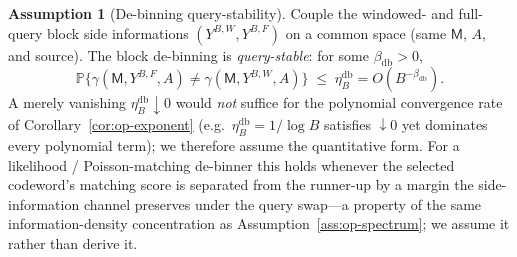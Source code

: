 \documentclass[11pt]{article}
\newcommand{\Prob}{\mathbb{P}}
\theoremstyle{plain}
\theoremstyle{definition}
\newtheorem{assumption}[theorem]{Assumption}
\theoremstyle{remark}
\begin{document}
\begin{assumption}[De-binning query-stability]
\label{ass:op-debin}
Couple the windowed- and full-query block side informations
$(Y^{B,W},Y^{B,F})$ on a common space (same $\mathsf M$, $A$, and
source). The block de-binning is \emph{query-stable}: for some
$\beta_{\mathrm{db}}>0$,
\[
\Prob\bigl\{\gamma(\mathsf M,Y^{B,F},A)\neq\gamma(\mathsf M,Y^{B,W},A)\bigr\}
\;\le\;\eta_B^{\mathrm{db}}=O(B^{-\beta_{\mathrm{db}}}).
\]
A merely vanishing $\eta_B^{\mathrm{db}}\downarrow0$ would \emph{not}
suffice for the polynomial convergence rate of
Corollary~\ref{cor:op-exponent} (e.g.\ $\eta_B^{\mathrm{db}}=1/\log B$
satisfies $\downarrow0$ yet dominates every polynomial term); we
therefore assume the quantitative form.
For a likelihood / Poisson-matching de-binner this holds whenever the
selected codeword's matching score is separated from the runner-up by
a margin the side-information channel preserves under the query
swap---a property of the same information-density concentration as
Assumption~\ref{ass:op-spectrum}; we assume it rather than derive it.
\end{assumption}
\end{document}
